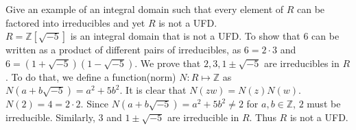 \documentclass[12pt]{article}
\begin{document}
Give an example of an integral domain such that every element of $R$ can be factored into irreducibles and yet $R$ is not a UFD.
\\

\noindent $R = \mathbb{Z}[\sqrt{-5}]$ is an integral domain that is not a UFD. To show that $6$ can be written as a product of different pairs of irreducibles, as $6 = 2\cdot3$ and $6 = (1 + \sqrt{-5})(1 - \sqrt{-5})$. We prove that $2, 3, 1 \pm \sqrt{-5}$ are irreducibles in $R$. To do that, we define a function(norm) $N: R \mapsto \mathbb{Z}$ as $N(a + b\sqrt{-5}) = a^2 + 5b^2.$ It is clear that $N(zw) = N(z)N(w).$ $N(2) = 4= 2\cdot 2$. Since $N(a +  b\sqrt{-5}) = a^2 + 5b^2 \neq 2$ for $a, b \in \mathbb{Z}$, $2$ must be irreducible. Similarly, $3$ and $1 \pm \sqrt{-5}$ are irreducible in $R$. Thus $R$ is not a UFD. 
\end{document}
